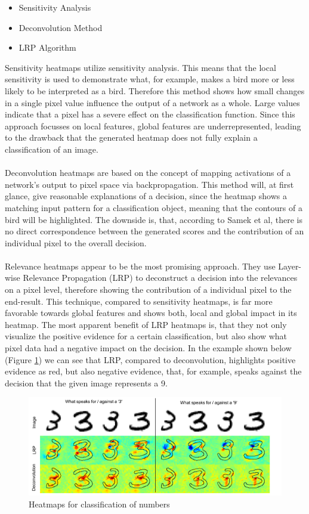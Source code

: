 \documentclass{acmsiggraph}               %
\begin{document}
\begin{itemize}
  \setlength\itemsep{0em}
  \item Sensitivity Analysis
  \item Deconvolution Method
  \item LRP Algorithm
\end{itemize}

Sensitivity heatmaps utilize sensitivity analysis. This means that the local sensitivity is used to demonstrate what, for example, makes a bird more or less likely to be interpreted as a bird. Therefore this method shows how small changes in a single pixel value influence the output of a network as a whole. Large values indicate that a pixel has a severe effect on the classification function. Since this approach focusses on local features, global features are underrepresented, leading to the drawback that the generated heatmap does not fully explain a classification of an image.\\\\
Deconvolution heatmaps are based on the concept of mapping activations of a network's output to pixel space via backpropagation. This method will, at first glance, give reasonable explanations of a decision, since the heatmap shows a matching input pattern for a classification object, meaning that the contours of a bird will be highlighted. The downside is, that, according to Samek et al, there is no direct correspondence between the generated scores and the contribution of an individual pixel to the overall decision.\\\\
Relevance heatmaps appear to be the most promising approach. They use Layer-wise Relevance Propagation (LRP) to deconstruct a decision into the relevances on a pixel level, therefore showing the contribution of a individual pixel to the end-result. This technique, compared to sensitivity heatmaps, is far more favorable towards global features and shows both, local and global impact in its heatmap. The most apparent benefit of LRP heatmaps is, that they not only visualize the positive evidence for a certain classification, but also show what pixel data had a negative impact on the decision. In the example shown below (Figure \ref{fig:heatmap_numbers}) we can see that LRP, compared to deconvolution, highlights positive evidence as red, but also negative evidence, that, for example, speaks against the decision that the given image represents a 9.

\begin{figure}
\center
\includegraphics[width=\textwidth]{heatmap_samek_et_al}
\caption{Heatmaps for classification of numbers \protect\cite{Samek2017}}
\label{fig:heatmap_numbers}
\end{figure}
\end{document}
